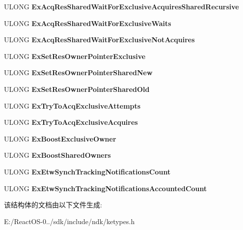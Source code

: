 \begin{DoxyCompactItemize}
U\+L\+O\+NG {\bfseries Ex\+Acq\+Res\+Shared\+Wait\+For\+Exclusive\+Acquires\+Shared\+Recursive}
\item 
\mbox{\label{struct___s_y_n_c_h___c_o_u_n_t_e_r_s_a5114c2471a6e8cfaf29352bfac2c6b8b}} 
U\+L\+O\+NG {\bfseries Ex\+Acq\+Res\+Shared\+Wait\+For\+Exclusive\+Waits}
\item 
\mbox{\label{struct___s_y_n_c_h___c_o_u_n_t_e_r_s_a830205c2dafb899733031354e86aad8a}} 
U\+L\+O\+NG {\bfseries Ex\+Acq\+Res\+Shared\+Wait\+For\+Exclusive\+Not\+Acquires}
\item 
\mbox{\label{struct___s_y_n_c_h___c_o_u_n_t_e_r_s_ac977cadbd2b370523462d151efb5b650}} 
U\+L\+O\+NG {\bfseries Ex\+Set\+Res\+Owner\+Pointer\+Exclusive}
\item 
\mbox{\label{struct___s_y_n_c_h___c_o_u_n_t_e_r_s_ad9cbb01c63cd25c863bfa6ac8e29360f}} 
U\+L\+O\+NG {\bfseries Ex\+Set\+Res\+Owner\+Pointer\+Shared\+New}
\item 
\mbox{\label{struct___s_y_n_c_h___c_o_u_n_t_e_r_s_a3096facc310e4e387238166a67fdfd54}} 
U\+L\+O\+NG {\bfseries Ex\+Set\+Res\+Owner\+Pointer\+Shared\+Old}
\item 
\mbox{\label{struct___s_y_n_c_h___c_o_u_n_t_e_r_s_a07cae242a71667c844d84894acd507da}} 
U\+L\+O\+NG {\bfseries Ex\+Try\+To\+Acq\+Exclusive\+Attempts}
\item 
\mbox{\label{struct___s_y_n_c_h___c_o_u_n_t_e_r_s_a0552dc0a022895f672c01ed65d863275}} 
U\+L\+O\+NG {\bfseries Ex\+Try\+To\+Acq\+Exclusive\+Acquires}
\item 
\mbox{\label{struct___s_y_n_c_h___c_o_u_n_t_e_r_s_aeb7c4b405c3a860d209c70b4a10fb175}} 
U\+L\+O\+NG {\bfseries Ex\+Boost\+Exclusive\+Owner}
\item 
\mbox{\label{struct___s_y_n_c_h___c_o_u_n_t_e_r_s_a90e6b06a9f747bacbb779131f7672e96}} 
U\+L\+O\+NG {\bfseries Ex\+Boost\+Shared\+Owners}
\item 
\mbox{\label{struct___s_y_n_c_h___c_o_u_n_t_e_r_s_a8c8f7a8f992bbf2fdfbd60c9f440db46}} 
U\+L\+O\+NG {\bfseries Ex\+Etw\+Synch\+Tracking\+Notifications\+Count}
\item 
\mbox{\label{struct___s_y_n_c_h___c_o_u_n_t_e_r_s_a427d669741d6df6c188fa9b80a7c04e4}} 
U\+L\+O\+NG {\bfseries Ex\+Etw\+Synch\+Tracking\+Notifications\+Accounted\+Count}
\end{DoxyCompactItemize}


该结构体的文档由以下文件生成\+:\begin{DoxyCompactItemize}
\item 
E\+:/\+React\+O\+S-\/0../sdk/include/ndk/ketypes.\+h\end{DoxyCompactItemize}
